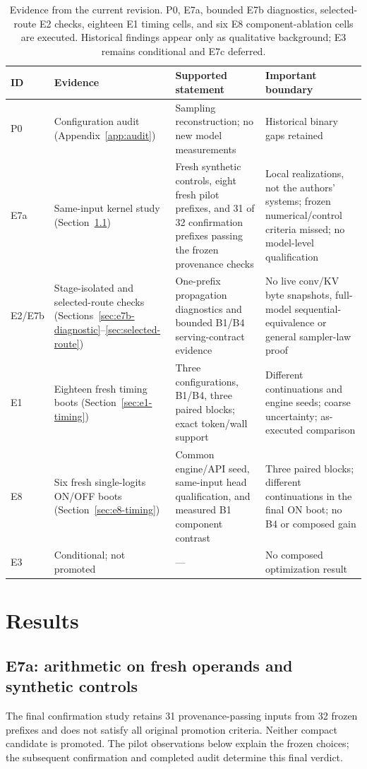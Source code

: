 \documentclass[conference]{IEEEtran}
\begin{document}
\begin{table}[t]
\caption{Evidence from the current revision. P0, E7a, bounded E7b diagnostics, selected-route E2 checks, eighteen E1 timing cells, and six E8 component-ablation cells are executed. Historical findings appear only as qualitative background; E3 remains conditional and E7c deferred.}
\label{tab:evidence}
\centering\footnotesize
\begin{tabularx}{\textwidth}{@{}p{}p{}Yp{0.25\textwidth}@{}}
\toprule
ID & Evidence & Supported statement & Important boundary \\
\midrule
P0 & Configuration audit (Appendix~\ref{app:audit}) & Sampling reconstruction; no new model measurements & Historical binary gaps retained \\
E7a & Same-input kernel study (Section~\ref{sec:e7a-pilot}) & Fresh synthetic controls, eight fresh pilot prefixes, and 31 of 32 confirmation prefixes passing the frozen provenance checks & Local realizations, not the authors' systems; frozen numerical/control criteria missed; no model-level qualification \\
E2/E7b & Stage-isolated and selected-route checks (Sections~\ref{sec:e7b-diagnostic}--\ref{sec:selected-route}) & One-prefix propagation diagnostics and bounded B1/B4 serving-contract evidence & No live conv/KV byte snapshots, full-model sequential-equivalence or general sampler-law proof \\
E1 & Eighteen fresh timing boots (Section~\ref{sec:e1-timing}) & Three configurations, B1/B4, three paired blocks; exact token/wall support & Different continuations and engine seeds; coarse uncertainty; as-executed comparison \\
E8 & Six fresh single-logits ON/OFF boots (Section~\ref{sec:e8-timing}) & Common engine/API seed, same-input head qualification, and measured B1 component contrast & Three paired blocks; different continuations in the final ON boot; no B4 or composed gain \\
E3 & Conditional; not promoted & --- & No composed optimization result \\
\bottomrule
\end{tabularx}
\end{table}

\section{Results}
\label{sec:results}
\subsection{E7a: arithmetic on fresh operands and synthetic controls}
\label{sec:e7a-pilot}
The final confirmation study retains 31 provenance-passing inputs from 32 frozen prefixes and does not satisfy all original promotion criteria. Neither compact candidate is promoted. The pilot observations below explain the frozen choices; the subsequent confirmation and completed audit determine this final verdict.
\end{document}
